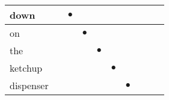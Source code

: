 \documentclass[landscape]{article}
\newcommand{\ssp}{\hspace{2pt}}
\newcommand{\mex}{\cellcolor{g}$\bullet$}
\begin{document}
\begin{tabular}{|l|p{10pt}|p{10pt}|p{10pt}|p{10pt}|p{10pt}|p{10pt}|p{10pt}|p{10pt}|p{10pt}|}
\hline
\ssp \cellcolor{ref1}down \ssp&\hspace{2pt}&\hspace{2pt}\mex&\hspace{2pt}&\hspace{2pt}&\hspace{2pt}&\hspace{2pt}&\hspace{2pt}&\hspace{2pt}&\hspace{2pt}\\
\hline
\ssp \cellcolor{ref2}on \ssp&\hspace{2pt}&\hspace{2pt}&\hspace{2pt}\mex&\hspace{2pt}&\hspace{2pt}&\hspace{2pt}&\hspace{2pt}&\hspace{2pt}&\hspace{2pt}\\
\hline
\ssp \cellcolor{ref3}the \ssp&\hspace{2pt}&\hspace{2pt}&\hspace{2pt}&\hspace{2pt}\mex&\hspace{2pt}&\hspace{2pt}&\hspace{2pt}&\hspace{2pt}&\hspace{2pt}\\
\hline
\ssp \cellcolor{ref4}ketchup \ssp&\hspace{2pt}&\hspace{2pt}&\hspace{2pt}&\hspace{2pt}&\hspace{2pt}\mex&\hspace{2pt}&\hspace{2pt}&\hspace{2pt}&\hspace{2pt}\\
\hline
\ssp \cellcolor{ref5}dispenser \ssp&\hspace{2pt}&\hspace{2pt}&\hspace{2pt}&\hspace{2pt}&\hspace{2pt}&\hspace{2pt}\mex&\hspace{2pt}&\hspace{2pt}&\hspace{2pt}\\

\end{tabular}
\end{document}
